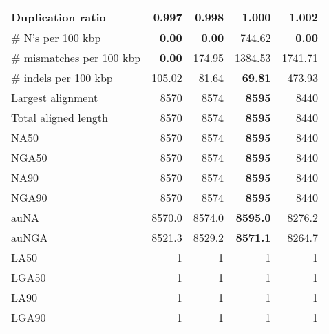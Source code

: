 \documentclass[12pt,a4paper]{article}
\begin{document}
\begin{table}[ht]
\begin{center}
\begin{tabular}{|l*{4}{|r}|}
Duplication ratio & {\bf 0.997} & 0.998 & 1.000 & 1.002 \\ \hline
\# N's per 100 kbp & {\bf 0.00} & {\bf 0.00} & 744.62 & {\bf 0.00} \\ \hline
\# mismatches per 100 kbp & {\bf 0.00} & 174.95 & 1384.53 & 1741.71 \\ \hline
\# indels per 100 kbp & 105.02 & 81.64 & {\bf 69.81} & 473.93 \\ \hline
Largest alignment & 8570 & 8574 & {\bf 8595} & 8440 \\ \hline
Total aligned length & 8570 & 8574 & {\bf 8595} & 8440 \\ \hline
NA50 & 8570 & 8574 & {\bf 8595} & 8440 \\ \hline
NGA50 & 8570 & 8574 & {\bf 8595} & 8440 \\ \hline
NA90 & 8570 & 8574 & {\bf 8595} & 8440 \\ \hline
NGA90 & 8570 & 8574 & {\bf 8595} & 8440 \\ \hline
auNA & 8570.0 & 8574.0 & {\bf 8595.0} & 8276.2 \\ \hline
auNGA & 8521.3 & 8529.2 & {\bf 8571.1} & 8264.7 \\ \hline
LA50 & 1 & 1 & 1 & 1 \\ \hline
LGA50 & 1 & 1 & 1 & 1 \\ \hline
LA90 & 1 & 1 & 1 & 1 \\ \hline
LGA90 & 1 & 1 & 1 & 1 \\ \hline
\end{tabular}
\end{center}
\end{table}
\end{document}
